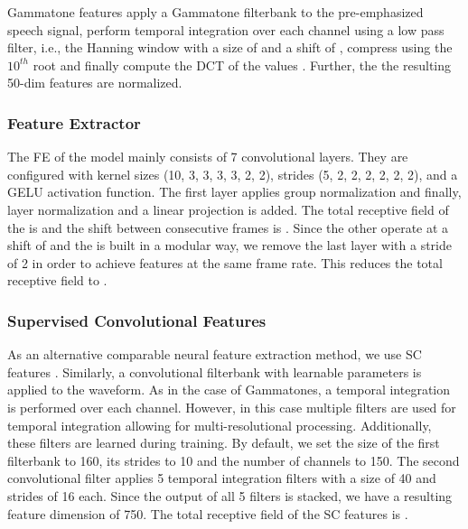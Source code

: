 \documentclass{INTERSPEECH2023}
\begin{document}
Gammatone features apply a Gammatone filterbank to the pre-emphasized speech signal, perform temporal integration over each channel using a low pass filter, i.e., the Hanning window with a size of  and a shift of , compress using the $10^{th}$ root and finally compute the \gls{DCT} of the values \cite{schlueter:icassp07}.
Further, the the resulting 50-dim features are normalized.

\subsubsection{\wvtwo Feature Extractor}
The \gls{FE} of the \wvtwo model \cite{facebook2020wav2vec2} mainly consists of 7 convolutional layers.
They are configured with kernel sizes (10, 3, 3, 3, 3, 2, 2), strides (5, 2, 2, 2, 2, 2, 2), and a GELU activation function.
The first layer applies group normalization and finally, layer normalization and a linear projection is added.
The total receptive field of the \wvtwo \fe is  and the shift between consecutive frames is .
Since the other \fes operate at a shift of  and the \wvtwo \fe is built in a modular way, we remove the last layer with a stride of 2 in order to achieve features at the same frame rate.
This reduces the total receptive field to .

\subsubsection{Supervised Convolutional Features}
As an alternative comparable neural feature extraction method, we use \gls{SC} features \cite{tuske2018:waveform, vieting2021waveform}.
Similarly, a convolutional filterbank with learnable parameters is applied to the waveform.
As in the case of Gammatones, a temporal integration is performed over each channel.
However, in this case multiple filters are used for temporal integration allowing for multi-resolutional processing.
Additionally, these filters are learned during training.
By default, we set the size of the first filterbank to 160, its strides to 10 and the number of channels to 150.
The second convolutional filter applies 5 temporal integration filters with a size of 40 and strides of 16 each.
Since the output of all 5 filters is stacked, we have a resulting feature dimension of 750.
The total receptive field of the \gls{SC} features is .
\end{document}
